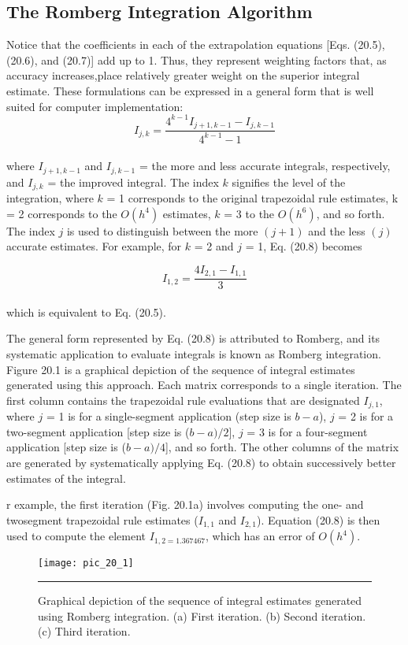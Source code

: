 \documentclass[../main.tex]{subfiles}
\begin{document}
\subsection{The Romberg Integration Algorithm}
Notice that the coefficients in each of the extrapolation equations [Eqs. (20.5), (20.6), and
(20.7)] add up to 1. Thus, they represent weighting factors that, as accuracy increases,place relatively greater weight on the superior integral estimate. These formulations can be
expressed in a general form that is well suited for computer implementation:
\begin{equation}
	\tag{20.8}
	I_{j,k}=\dfrac{4^{k-1}I_{j+1,k-1}-I_{j,k-1}}{4^{k-1}-1}
\end{equation}\\
where $I_{j+1,k−1}$ and $I_{j,k−1}$ = the more and less accurate integrals, respectively, and $I_{j,k}$ =
the improved integral. The index $k$ signifies the level of the integration, where $k$ = 1 corresponds to the original trapezoidal rule estimates, k = 2 corresponds to the $O(h^4)$ estimates, $k$ = 3 to the $O(h^6)$, and so forth. The index $j$ is used to distinguish between the more
$(j + 1)$ and the less $(j)$ accurate estimates. For example, for $k$ = 2 and $j$ = 1, Eq. (20.8)
becomes

	$$I_{1,2}=\dfrac{4I_{2,1}-I_{1,1}}{3}$$\\
which is equivalent to Eq. (20.5).

The general form represented by Eq. (20.8) is attributed to Romberg, and its systematic application to evaluate integrals is known as Romberg integration. Figure 20.1 is a
graphical depiction of the sequence of integral estimates generated using this approach.
Each matrix corresponds to a single iteration. The first column contains the trapezoidal rule
evaluations that are designated $I_{j,1}$, where $j$ = 1 is for a single-segment application (step
size is $b − a$), $j$ = 2 is for a two-segment application [step size is ($b − a)/2$], $j$ = 3 is for
a four-segment application [step size is ($b − a)/4$], and so forth. The other columns of the
matrix are generated by systematically applying Eq. (20.8) to obtain successively better
estimates of the integral.

r example, the first iteration (Fig. 20.1a) involves computing the one- and twosegment trapezoidal rule estimates ($I_{1,1}$ and $I_{2,1}$). Equation (20.8) is then used to compute
the element $I_{1,2 = 1.367467}$, which has an error of $O(h^4)$.
\pagebreak

\begin{figure}[hbt!]
	\centering
	\texttt{[image: pic\_20\_1]}
	\caption{\textsf{Graphical depiction of the sequence of integral estimates generated using Romberg integration.
(a) First iteration. (b) Second iteration. (c) Third iteration.}} \hrule
	\label{pic.20.1}
\end{figure}
\vspace{0.3in}
\end{document}
